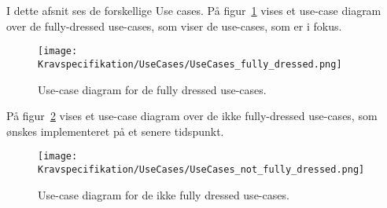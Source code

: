 I dette afsnit ses de forskellige Use cases. På figur~\ref{fig:fullydressedusecases} vises et use-case diagram over de fully-dressed use-cases, som viser de use-cases, som er i fokus. 
\begin{figure}[H]
	\centering
	\texttt{[image: Kravspecifikation/UseCases/UseCases\_fully\_dressed.png]}
	\caption{Use-case diagram for de fully dressed use-cases.}
	\label{fig:fullydressedusecases}
\end{figure}

På figur~\ref{fig:ikkefullydressedusecases} vises et use-case diagram over de ikke fully-dressed use-cases, som ønskes implementeret på et senere tidspunkt. 

\begin{figure}[H]
	\centering
	\texttt{[image: Kravspecifikation/UseCases/UseCases\_not\_fully\_dressed.png]}
	\caption{Use-case diagram for de ikke fully dressed use-cases.}
	\label{fig:ikkefullydressedusecases}
\end{figure}

\newpage

\newpage		

\newpage

\newpage

